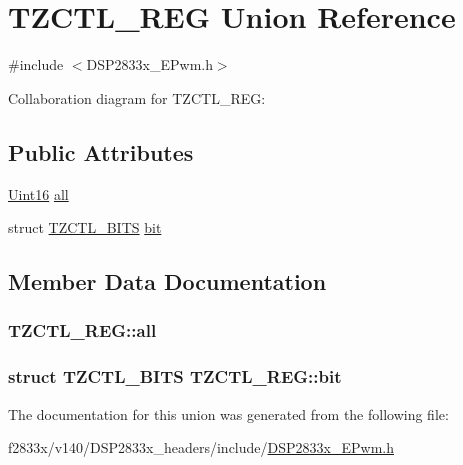 \hypertarget{union_t_z_c_t_l___r_e_g}{}\section{T\+Z\+C\+T\+L\+\_\+\+R\+E\+G Union Reference}
\label{union_t_z_c_t_l___r_e_g}


{\ttfamily \#include $<$D\+S\+P2833x\+\_\+\+E\+Pwm.\+h$>$}



Collaboration diagram for T\+Z\+C\+T\+L\+\_\+\+R\+E\+G\+:
\subsection*{Public Attributes}
\begin{DoxyCompactItemize}
\item 
\hyperlink{_d_s_p2833x___device_8h_a59a9f6be4562c327cbfb4f7e8e18f08b}{Uint16} \hyperlink{union_t_z_c_t_l___r_e_g_ad7607a709a969964468ac0c0cbe37c00}{all}
\item 
struct \hyperlink{struct_t_z_c_t_l___b_i_t_s}{T\+Z\+C\+T\+L\+\_\+\+B\+I\+T\+S} \hyperlink{union_t_z_c_t_l___r_e_g_a092a579dd9c8c7a8093db8f52d9f4c56}{bit}
\end{DoxyCompactItemize}


\subsection{Member Data Documentation}
\hypertarget{union_t_z_c_t_l___r_e_g_ad7607a709a969964468ac0c0cbe37c00}{}
\subsubsection[{all}]{ T\+Z\+C\+T\+L\+\_\+\+R\+E\+G\+::all}\label{union_t_z_c_t_l___r_e_g_ad7607a709a969964468ac0c0cbe37c00}
\hypertarget{union_t_z_c_t_l___r_e_g_a092a579dd9c8c7a8093db8f52d9f4c56}{}
\subsubsection[{bit}]{\setlength{\rightskip}{0pt plus 5cm}struct {\bf T\+Z\+C\+T\+L\+\_\+\+B\+I\+T\+S} T\+Z\+C\+T\+L\+\_\+\+R\+E\+G\+::bit}\label{union_t_z_c_t_l___r_e_g_a092a579dd9c8c7a8093db8f52d9f4c56}


The documentation for this union was generated from the following file\+:\begin{DoxyCompactItemize}
\item 
f2833x/v140/\+D\+S\+P2833x\+\_\+headers/include/\hyperlink{_d_s_p2833x___e_pwm_8h}{D\+S\+P2833x\+\_\+\+E\+Pwm.\+h}\end{DoxyCompactItemize}
